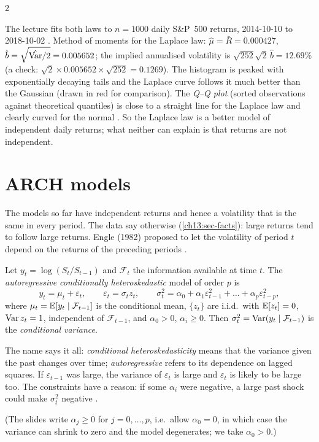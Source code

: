 \begin{paracol}{2}
\begin{casestudy}\label{ch13:cs-laplace}
The lecture fits both laws to $n=1000$ daily S\&P~500 returns, 2014-10-10 to 2018-10-02 . Method of moments for the Laplace law:
$\hat\mu=\bar R=0.000427$, $\hat b=\sqrt{\hat{\operatorname{Var}}/2}=0.005652$; the implied annualised volatility is $\sqrt{252}\sqrt2\,\hat b=12.69\%$ (a check: $\sqrt2\times0.005652\times\sqrt{252}=0.1269$). The
histogram is peaked with exponentially decaying tails and the Laplace curve follows it much better than the Gaussian (drawn in red for comparison). The \emph{Q--Q plot} (sorted observations against theoretical quantiles) is
close to a straight line for the Laplace law and clearly curved for the normal . So the Laplace law is a better model of independent daily returns;
what neither can explain is that returns are not independent.
\end{casestudy}

\section{ARCH models}\label{ch13:sec-arch}
The models so far have independent returns and hence a volatility that is the same in every period. The data say otherwise (\cref{ch13:sec-facts}): large
returns tend to follow large returns. Engle (1982) proposed to let the volatility of period $t$ depend on the returns of the
preceding periods .

\begin{definition}[ARCH$(p)$]\label{ch13:def-arch}
Let $y_t=\log(S_t/S_{t-1})$ and $\mathcal F_t$ the information available at time $t$. The \emph{autoregressive conditionally heteroskedastic} model of order $p$ is
\begin{equation}\label{ch13:eq-arch}
  y_t=\mu_t+\varepsilon_t,\qquad \varepsilon_t=\sigma_tz_t,\qquad
  \sigma_t^2=\alpha_0+\alpha_1\varepsilon_{t-1}^2+\dots+\alpha_p\varepsilon_{t-p}^2,
\end{equation}
where $\mu_t=\mathbb{E}[y_t\mid\mathcal F_{t-1}]$ is the conditional mean, $\{z_t\}$ are i.i.d.\ with $\mathbb{E}[z_t]=0$, $\operatorname{Var} z_t=1$, independent of $\mathcal F_{t-1}$, and
$\alpha_0>0$, $\alpha_i\ge0$. Then $\sigma_t^2=\operatorname{Var}(y_t\mid\mathcal F_{t-1})$ is the \emph{conditional variance}.
\end{definition}
The name says it all: \emph{conditional heteroskedasticity} means that the variance given the past changes over time; \emph{autoregressive} refers to its dependence on lagged squares. If $\varepsilon_{t-1}$ was
large, the variance of $\varepsilon_t$ is large and $\varepsilon_t$ is likely to be large too. The constraints have a reason: if some $\alpha_i$ were negative, a large past shock could make $\sigma_t^2$ negative
.
\begin{secondary}
(The slides write $\alpha_j\ge0$ for $j=0,\dots,p$, i.e.\ allow $\alpha_0=0$, in which case the variance can shrink to zero and the model degenerates; we take $\alpha_0>0$.)
\end{secondary}


\end{paracol}
